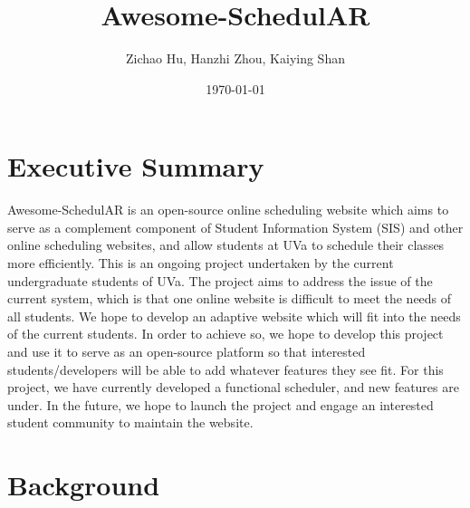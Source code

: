 \documentclass[dvips,12pt]{article}
\begin{document}

\title{Awesome-SchedulAR}
\author{Zichao Hu, Hanzhi Zhou, Kaiying Shan}
\date{\today}



\maketitle


\section{Executive Summary}


Awesome-SchedulAR is an open-source online scheduling website which aims to serve as 
a complement component of Student Information System (SIS) and other 
online scheduling websites, and allow students at
UVa to schedule their classes more efficiently. This is an ongoing 
project undertaken by the current undergraduate students of UVa. 
The project aims to address the issue of the current system, which is
that one online website is difficult to meet the needs of all students.
We hope to develop an adaptive website which will fit into the needs 
of the current students. In order to achieve so, we hope to 
develop this project and use it to serve as an open-source platform 
so that interested students/developers will be able to add whatever 
features they see fit. For this project, we have currently developed 
a functional scheduler, and new features are under. In the future, we hope to launch the project and 
engage an interested student community to maintain the website. 






\section{Background}
\end{document}
